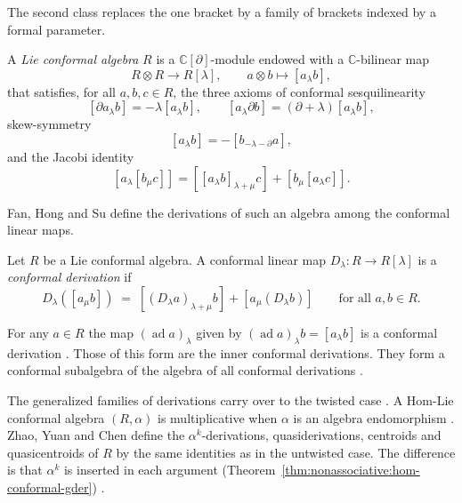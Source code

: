 The second class replaces the one bracket by a family of brackets indexed by
a formal parameter.

\begin{definition}
\label{def:nonassociative:lie-conformal}
A \emph{Lie conformal algebra} $R$ is a $\mathbb{C}[\partial]$-module
endowed with a $\mathbb{C}$-bilinear map
\[
R\otimes R\to R[\lambda],\qquad a\otimes b\mapsto [a_\lambda b],
\]
that satisfies, for all $a,b,c\in R$, the three axioms of conformal
sesquilinearity
\[
[\partial a_\lambda b]=-\lambda[a_\lambda b],\qquad
[a_\lambda\partial b]=(\partial+\lambda)[a_\lambda b],
\]
skew-symmetry
\[
[a_\lambda b]=-[b_{-\lambda-\partial}a],
\]
and the Jacobi identity
\[
[a_\lambda[b_\mu c]]=[[a_\lambda b]_{\lambda+\mu}c]
+[b_\mu[a_\lambda c]].
\]
\end{definition}

Fan, Hong and Su define the derivations of such an algebra among the
conformal linear maps.

\begin{definition}
\label{def:nonassociative:conformal-derivation}
Let $R$ be a Lie conformal algebra. A conformal linear map
$D_\lambda\colon R\to R[\lambda]$ is a \emph{conformal derivation} if
\[
D_\lambda([a_\mu b])\;=\;[(D_\lambda a)_{\lambda+\mu}b]
+[a_\mu(D_\lambda b)]
\qquad\text{for all }a,b\in R.
\]
\end{definition}

For any $a\in R$ the map $(\operatorname{ad} a)_\lambda$ given by
$(\operatorname{ad} a)_\lambda b=[a_\lambda b]$ is a conformal derivation
\cite[Definition~2.7, p.~4]{FanHongSu2019}. Those of this form are the inner
conformal derivations. They form a conformal subalgebra of the algebra of all
conformal derivations \cite[Definition~2.7, p.~4]{FanHongSu2019}.

The generalized families of derivations carry over to the twisted case
\cite[p.~3]{ZhaoYuanChen2018}. A Hom-Lie conformal algebra $(R,\alpha)$ is
multiplicative when $\alpha$ is an algebra endomorphism
\cite[p.~3]{ZhaoYuanChen2018}. Zhao, Yuan and Chen define the
$\alpha^{k}$-derivations, quasiderivations, centroids and quasicentroids of
$R$ by the same identities as in the untwisted case. The difference is that
$\alpha^{k}$ is
inserted in each argument
(Theorem~\ref{thm:nonassociative:hom-conformal-gder})
\cite[p.~16]{ZhaoYuanChen2018}.

